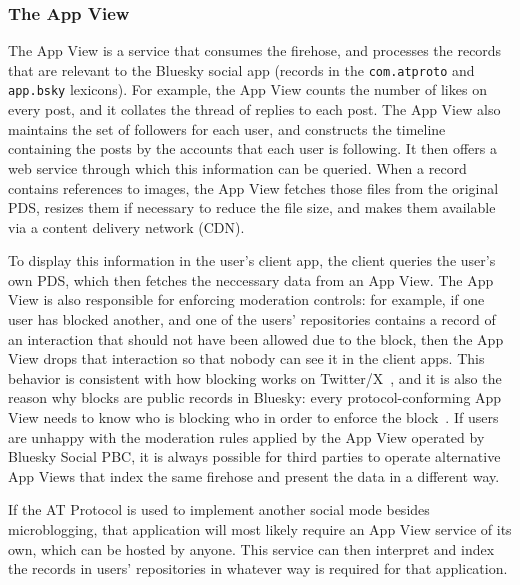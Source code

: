 \documentclass[sigconf,nonacm]{acmart}
\begin{document}

\subsubsection{The App View}\label{sec:appview}

The App View is a service that consumes the firehose, and processes the records that are relevant to the Bluesky social app (records in the \texttt{com.atproto} and \texttt{app.bsky} lexicons).
For example, the App View counts the number of likes on every post, and it collates the thread of replies to each post.
The App View also maintains the set of followers for each user, and constructs the timeline containing the posts by the accounts that each user is following.
It then offers a web service through which this information can be queried.
When a record contains references to images, the App View fetches those files from the original PDS, resizes them if necessary to reduce the file size, and makes them available via a content delivery network (CDN).

To display this information in the user's client app, the client queries the user's own PDS, which then fetches the neccessary data from an App View.
The App View is also responsible for enforcing moderation controls: for example, if one user has blocked another, and one of the users' repositories contains a record of an interaction that should not have been allowed due to the block, then the App View drops that interaction so that nobody can see it in the client apps.
This behavior is consistent with how blocking works on Twitter/X~\cite{TwitterBlock}, and it is also the reason why blocks are public records in Bluesky: every protocol-conforming App View needs to know who is blocking who in order to enforce the block~\cite{PublicBlocks,PrivateBlocks}.
If users are unhappy with the moderation rules applied by the App View operated by Bluesky Social PBC, it is always possible for third parties to operate alternative App Views that index the same firehose and present the data in a different way.

If the AT Protocol is used to implement another social mode besides microblogging, that application will most likely require an App View service of its own, which can be hosted by anyone.
This service can then interpret and index the records in users' repositories in whatever way is required for that application.
\end{document}
